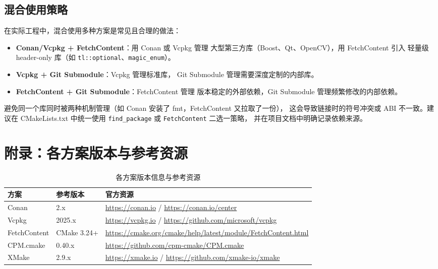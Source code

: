 \documentclass[12pt,a4paper,fontset=fandol]{ctexbook}
\begin{document}
\subsection{混合使用策略}

在实际工程中，混合使用多种方案是常见且合理的做法：

\begin{itemize}[nosep]
  \item \textbf{Conan/Vcpkg + FetchContent}：用 Conan 或 Vcpkg 管理
        大型第三方库（Boost、Qt、OpenCV），用 FetchContent 引入
        轻量级 header-only 库（如 \texttt{tl::optional}、\texttt{magic\_enum}）。
  \item \textbf{Vcpkg + Git Submodule}：Vcpkg 管理标准库，
        Git Submodule 管理需要深度定制的内部库。
  \item \textbf{FetchContent + Git Submodule}：FetchContent 管理
        版本稳定的外部依赖，Git Submodule 管理频繁修改的内部依赖。
\end{itemize}

\begin{note}[ title={混合使用的关键原则}]
避免同一个库同时被两种机制管理（如 Conan 安装了 fmt，FetchContent 又拉取了一份），
这会导致链接时的符号冲突或 ABI 不一致。建议在 CMakeLists.txt 中统一使用
\texttt{find\_package} 或 \texttt{FetchContent} 二选一策略，
并在项目文档中明确记录依赖来源。
\end{note}

\section{附录：各方案版本与参考资源}

\begin{table}[H]
\centering
\caption{各方案版本信息与参考资源}
\label{tab:resources}
\small
\begin{tabularx}{\textwidth}{l l >{\raggedright\arraybackslash}X}
\toprule
\textbf{方案} & \textbf{参考版本} & \textbf{官方资源} \\
\midrule
Conan      & 2.x       & \url{https://conan.io} / \url{https://conan.io/center} \\
Vcpkg      & 2025.x    & \url{https://vcpkg.io} / \url{https://github.com/microsoft/vcpkg} \\
FetchContent & CMake 3.24+ & \url{https://cmake.org/cmake/help/latest/module/FetchContent.html} \\
CPM.cmake  & 0.40.x    & \url{https://github.com/cpm-cmake/CPM.cmake} \\
XMake      & 2.9.x     & \url{https://xmake.io} / \url{https://github.com/xmake-io/xmake} \\
\bottomrule
\end{tabularx}
\end{table}
\end{document}
